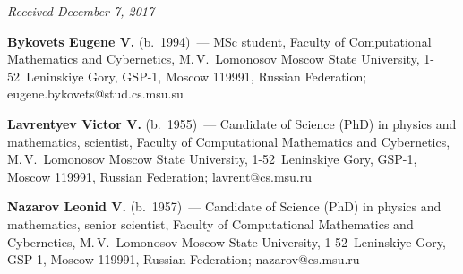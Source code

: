 \vspace*{-3pt}

\hfill{\small\textit{Received December 7, 2017}}





\Contr

\noindent
\textbf{Bykovets Eugene V.} (b.\ 1994)~--- MSc student,  
Faculty of Computational Mathematics and Cybernetics, M.\,V.~Lomonosov Moscow 
State University, 1-52~Leninskiye Gory, GSP-1, Moscow 119991, Russian Federation; 
\mbox{eugene.bykovets@stud.cs.msu.su}

\vspace*{3pt}

\noindent
\textbf{Lavrentyev Victor V.} (b.\ 1955)~---  
Candidate of Science (PhD) in physics and mathematics, scientist, 
Faculty of Computational Mathematics and Cybernetics, M.\,V.~Lomonosov Moscow 
State University, 1-52~Leninskiye Gory, GSP-1, Moscow 119991, Russian Federation; 
\mbox{lavrent@cs.msu.ru}

\vspace*{3pt}

\noindent
\textbf{Nazarov Leonid V.} (b.\ 1957)~--- 
Candidate of Science (PhD) in physics and mathematics, senior scientist, 
Faculty of Computational Mathematics and Cybernetics, M.\,V.~Lomonosov Moscow 
State University, 1-52~Leninskiye Gory, GSP-1, Moscow 119991, Russian Federation; 
\mbox{nazarov@cs.msu.ru}
\label{end\stat}


\renewcommand{\bibname}{\protect\rm Литература} 